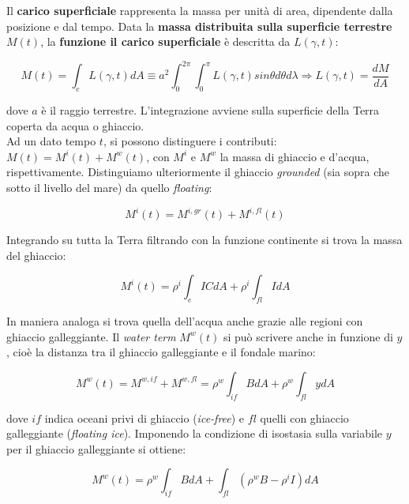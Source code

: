 \documentclass[a4paper,12pt]{book}
\begin{document}
Il \textbf{carico superficiale} rappresenta la massa per unità di area, dipendente dalla posizione e dal tempo.
Data la \textbf{massa distribuita sulla superficie terrestre} $M(t)$, la \textbf{funzione il carico superficiale} è descritta da $L(\gamma, t)$:

\begin{equation}
    M(t) = \int_e L (\gamma, t) dA \equiv a^2 \int_0^{2\pi} \int_0^\pi L(\gamma, t) sin \theta d \theta d \lambda \Longrightarrow L(\gamma, t) = \frac{dM}{dA}
\end{equation}

\noindent
dove $a$ è il raggio terrestre. L'integrazione avviene sulla superficie della Terra coperta da acqua o ghiaccio.\\

\noindent
Ad un dato tempo $t$, si possono distinguere i contributi: $M(t) = M^i(t) + M^w (t)$, con $M^i$ e $M^w$ la massa di ghiaccio e d'acqua, rispettivamente.
Distinguiamo ulteriormente il ghiaccio \textit{grounded} (sia sopra che sotto il livello del mare) da quello \textit{floating}:

\begin{equation}
    M^i(t) = M^{i,gr}(t) + M^{i,fl}(t)
\end{equation}

\noindent
Integrando su tutta la Terra filtrando con la funzione continente si trova la massa del ghiaccio:

\begin{equation}
    M^i(t) = \rho^i \int_e ICdA + \rho^i \int_{fl}IdA
\end{equation}

\noindent In maniera analoga si trova quella dell’acqua anche grazie alle regioni con ghiaccio galleggiante.
Il \textit{water term} $M^w(t)$ si può scrivere anche in funzione di $y$, cioè la distanza tra il ghiaccio galleggiante e il fondale marino:

\begin{equation}
    M^w(t) = M^{w,if} + M^{w,fl} = \rho^w \int_{if}BdA + \rho^w\int_{fl}ydA
\end{equation}

\noindent
dove $if$ indica oceani privi di ghiaccio (\textit{ice-free}) e $fl$ quelli con ghiaccio galleggiante (\textit{floating ice}).
Imponendo la condizione di isostasia sulla variabile $y$ per il ghiaccio galleggiante si ottiene:

\begin{equation}
    M^w(t) = \rho^w \int_{if}BdA + \int_{fl} (\rho^wB - \rho^i I)dA
\end{equation}
\end{document}
